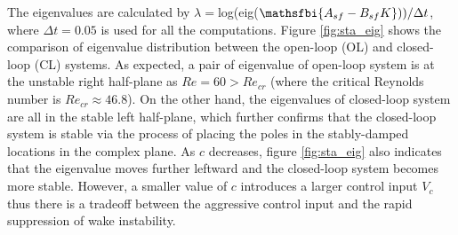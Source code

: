 \documentclass[standard]{jfm}
\begin{document}
The eigenvalues are calculated by $\lambda=$log(eig($\mathsfbi{A_{sf}-B_{sf}K}))/\Delta t$, where $\Delta t=0.05$ is used for all the computations. Figure \ref{fig:sta_eig} shows 
the  comparison of eigenvalue distribution between the open-loop (OL) and closed-loop (CL)
systems. As expected, a pair of eigenvalue of open-loop system is at the unstable
right half-plane as $Re=60 > Re_{cr}$ (where the critical Reynolds number is
$Re_{cr} \approx 46.8$). 
On the other hand, the eigenvalues of closed-loop system are all in the stable 
left half-plane, which further confirms that the closed-loop system is stable 
via the process of placing the poles in the stably-damped locations in the complex plane. 
As $c$ decreases, figure \ref{fig:sta_eig} also indicates that 
the eigenvalue moves further leftward and the closed-loop system becomes more stable. 
 However, a smaller value of $c$ introduces a larger control input $V_c$ thus   
 there is a tradeoff between the aggressive control input and the 
 rapid suppression of wake instability. 
\end{document}
